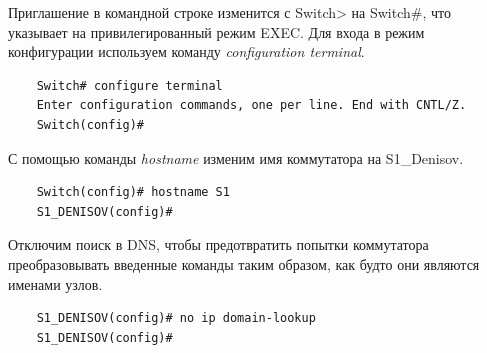 \documentclass[a4paper,14pt]{extarticle}
\begin{document}
Приглашение в командной строке изменится с Switch> на Switch\#, что указывает на привилегированный режим EXEC.
Для входа в режим конфигурации используем команду \textit{configuration terminal}.
\begin{lstlisting}
	Switch# configure terminal
	Enter configuration commands, one per line. End with CNTL/Z.
	Switch(config)#
\end{lstlisting}
С помощью команды \textit{hostname} изменим имя коммутатора на S1\_Denisov.
\begin{lstlisting}
	Switch(config)# hostname S1
	S1_DENISOV(config)#
\end{lstlisting}
Отключим поиск в DNS, чтобы предотвратить попытки коммутатора преобразовывать введенные
команды таким образом, как будто они являются именами узлов.
\begin{lstlisting}
	S1_DENISOV(config)# no ip domain-lookup
	S1_DENISOV(config)#
\end{lstlisting}
\end{document}
